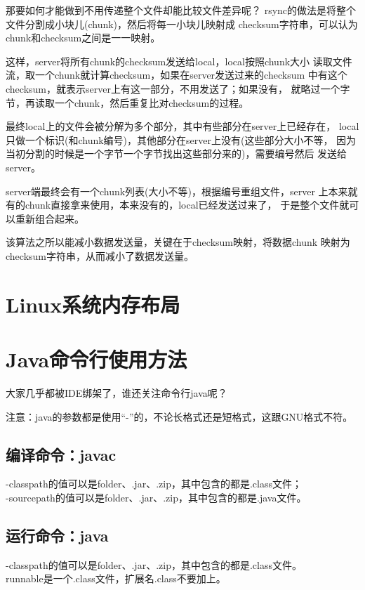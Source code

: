 ﻿\documentclass[a4paper,11pt]{article}
\begin{document}
  那要如何才能做到不用传递整个文件却能比较文件差异呢？
  rsync的做法是将整个文件分割成小块儿(chunk)，然后将每一小块儿映射成
  checksum字符串，可以认为chunk和checksum之间是一一映射。

  这样，server将所有chunk的checksum发送给local，local按照chunk大小
  读取文件流，取一个chunk就计算checksum，如果在server发送过来的checksum
  中有这个checksum，就表示server上有这一部分，不用发送了；如果没有，
  就略过一个字节，再读取一个chunk，然后重复比对checksum的过程。

  最终local上的文件会被分解为多个部分，其中有些部分在server上已经存在，
  local只做一个标识(和chunk编号)，其他部分在server上没有(这些部分大小不等，
  因为当初分割的时候是一个字节一个字节找出这些部分来的)，需要编号然后
  发送给server。

  server端最终会有一个chunk列表(大小不等)，根据编号重组文件，server
  上本来就有的chunk直接拿来使用，本来没有的，local已经发送过来了，
  于是整个文件就可以重新组合起来。

  该算法之所以能减小数据发送量，关键在于checksum映射，将数据chunk
  映射为checksum字符串，从而减小了数据发送量。


  \section[Linux系统内存布局]{Linux系统内存布局}
  


  \section[Java命令行使用方法]{Java命令行使用方法}
  大家几乎都被IDE绑架了，谁还关注命令行java呢？\par
  注意：java的参数都是使用“-”的，不论长格式还是短格式，这跟GNU格式不符。
  \subsection[编译命令：javac]{编译命令：javac}
  -classpath的值可以是folder、.jar、.zip，其中包含的都是.class文件；\\
  -sourcepath的值可以是folder、.jar、.zip，其中包含的都是.java文件。

  \subsection[运行命令：java]{运行命令：java}
  -classpath的值可以是folder、.jar、.zip，其中包含的都是.class文件。\\
  runnable是一个.class文件，扩展名.class不要加上。
\end{document}
